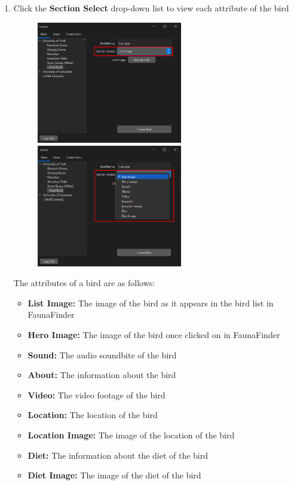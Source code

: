 \begin{enumerate}
    \item Click the \textbf{Section Select} drop-down list to view each attribute of the bird
    \begin{figure}[H]
        \centering
        \includegraphics[width=0.6\textwidth]{MainTab/AddBird/addBirdSelect.PNG}
        \includegraphics[width=0.6\textwidth]{MainTab/AddBird/addBirdDropdown.PNG}
    \end{figure}
    The attributes of a bird are as follows:
    \begin{itemize}
        \item \textbf{List Image:} The image of the bird as it appears in the bird list in FaunaFinder
        \item \textbf{Hero Image:} The image of the bird once clicked on in FaunaFinder
        \item \textbf{Sound:} The audio soundbite of the bird
        \item \textbf{About:} The information about the bird
        \item \textbf{Video:} The video footage of the bird
        \item \textbf{Location:} The location of the bird
        \item \textbf{Location Image:} The image of the location of the bird
        \item \textbf{Diet:} The information about the diet of the bird
        \item \textbf{Diet Image:} The image of the diet of the bird
    \end{itemize}
    

\end{enumerate}
